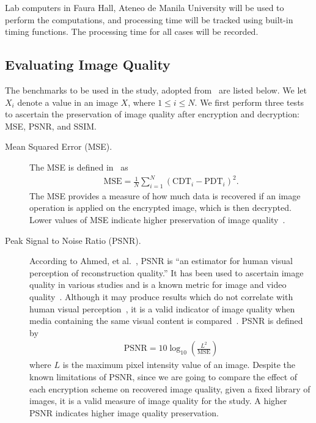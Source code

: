 Lab computers in Faura Hall, Ateneo de Manila University will be used to perform the computations, and processing time will be tracked using built-in timing functions.
The processing time for all cases will be recorded.

\subsection{Evaluating Image Quality}
The benchmarks to be used in the study, adopted from~\cite{ahmed_benchmark_2016, ahmad_efficiency_2012, wu_npcr_2011} are listed below. We let $X_i$ denote a value in an image $X$, where $1 \leq i \leq N$.
We first perform three tests to ascertain the preservation of image quality after encryption and decryption: MSE, PSNR, and SSIM.
\begin{description}
	\item [Mean Squared Error (MSE).] The MSE is defined in~\cite{ahmed_benchmark_2016} as
	\begin{align}
        \mathrm{MSE} = \frac{1}{N}\sum_{i=1}^{N}{(\mathrm{CDT}_i - \mathrm{PDT}_i)^2}.
	\end{align}
	The MSE provides a measure of how much data is recovered if an image operation is applied on the encrypted image, which is then decrypted. Lower values of MSE indicate higher preservation of image quality~\cite{ahmed_benchmark_2016, ahmad_efficiency_2012}.
	\item [Peak Signal to Noise Ratio (PSNR).]
	According to Ahmed, et al.~\cite{ahmed_benchmark_2016}, PSNR is ``an estimator for human visual perception of reconstruction quality.'' It has been used to ascertain image quality in various studies and is a known metric for image and video quality~\cite{upmanyu_efficient_2009, jain_image_2016, akramullah_video_2014}. Although it may produce results which do not correlate with human visual perception~\cite{huynh-thu_accuracy_2012, ahmed_benchmark_2016}, it is a valid indicator of image quality when media containing the same visual content is compared~\cite{huynh-thu_accuracy_2012}.
	PSNR is defined by
	\begin{align}
        \mathrm{PSNR} = 10\log_{10}{\left( \frac{L^2}{\mathrm{MSE}} \right)}
	\end{align}
	where $L$ is the maximum pixel intensity value of an image.
	Despite the known limitations of PSNR, since we are going to compare the effect of each encryption scheme on recovered image quality, given a fixed library of images, it is a valid measure of image quality for the study. A higher PSNR indicates higher image quality preservation.

\end{description}
